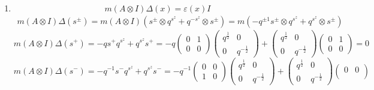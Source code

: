 \documentclass[12pt]{article}
\theoremstyle{definition}
\begin{document}
\begin{enumerate}
\begin{enumerate}
        \item \begin{equation}
            m(A\otimes I)\Delta(x)=\varepsilon(x)I
        \end{equation}
        \begin{multline*}
            m(A\otimes I)\Delta(s^\pm)=m(A\otimes I)(s^\pm\otimes q^{s^z}+q^{-s^z}\otimes s^\pm)=m(-q^{\pm1}s^\pm\otimes q^{s^z}+q^{s^z}\otimes s^{\pm})
        \end{multline*}
        \begin{equation*}
            m(A\otimes I)\Delta(s^+)=-qs^+q^{s^z}+q^{s^z}s^+=-q\begin{pmatrix}
                    0 & 1\\
                    0 & 0
                \end{pmatrix}\begin{pmatrix}
                    q^\frac{1}{2} & 0\\
                    0 & q^{-\frac{1}{2}}
                \end{pmatrix}+\begin{pmatrix}
                    q^\frac{1}{2} & 0\\
                    0 & q^{-\frac{1}{2}}
                \end{pmatrix}\begin{pmatrix}
                    0 & 1\\
                    0 & 0
                \end{pmatrix}=0
        \end{equation*}
        \begin{equation*}
            m(A\otimes I)\Delta(s^-)=-q^{-1}s^-q^{s^z}+q^{s^z}s^-=-q^{-1}\begin{pmatrix}
                    0 & 0\\
                    1 & 0
                \end{pmatrix}\begin{pmatrix}
                    q^\frac{1}{2} & 0\\
                    0 & q^{-\frac{1}{2}}
                \end{pmatrix}+\begin{pmatrix}
                    q^{\frac{1}{2}} & 0\\
                    0 & q^{-\frac{1}{2}}
                \end{pmatrix}\begin{pmatrix}
                    0 & 0\\

\end{pmatrix}
\end{equation*}
\end{enumerate}
\end{enumerate}
\end{document}
